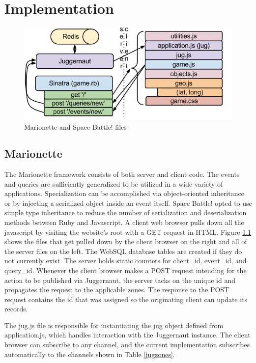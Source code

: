 \documentclass[12pt]{report}	%
\theoremstyle{definition}
\theoremstyle{remark}
\begin{document}
\chapter{Implementation}

\begin{figure}[h!]
\centering
\includegraphics[scale=0.6]{3.png}
\caption{Marionette and Space Battle! files}
\label{files}
\end{figure}

\section{Marionette}

The Marionette framework consists of both server and client code. The
events and queries are sufficiently generalized to be utilized in a wide
variety of applications. Specialization can be accomplished via object-oriented 
inheritance or by injecting a serialized object inside an
event itself. Space Battle! opted to use simple type inheritance to
reduce the number of serialization and deserialization methods between
Ruby and Javascript. A client web browser pulls down all the javascript
by visiting the website's root with a GET request in HTML. Figure
\ref{files} shows the files that get pulled down by the
client browser on the right and all of the server files on the left. The
WebSQL database tables are created if they do not currently exist. The
server holds static counters for client\_id, event\_id, and query\_id.
Whenever the client browser makes a POST request intending for the
action to be published via Juggernaut, the server tacks on the unique id
and propagates the request to the applicable zones. The response to the
POST request contains the id that was assigned so the originating client
can update its records.

The jug.js file is responsible for instantiating the jug object defined
from application.js, which handles interaction with the Juggernaut
instance. The client browser can subscribe to any channel, and the
current implementation subscribes automatically to the channels shown in
Table \ref{jugzones}.
\end{document}
